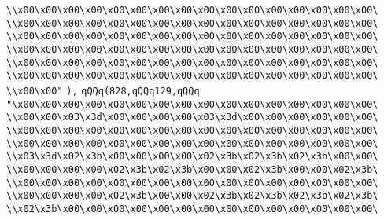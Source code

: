 \verb|\\x00\x00\x00\x00\x00\x00\x00\x00\x00\x00\x00\x00\x00\x00\x00\x00\|\newline
\verb|\\x00\x00\x00\x00\x00\x00\x00\x00\x00\x00\x00\x00\x00\x00\x00\x00\|\newline
\verb|\\x00\x00\x00\x00\x00\x00\x00\x00\x00\x00\x00\x00\x00\x00\x00\x00\|\newline
\verb|\\x00\x00\x00\x00\x00\x00\x00\x00\x00\x00\x00\x00\x00\x00\x00\x00\|\newline
\verb|\\x00\x00\x00\x00\x00\x00\x00\x00\x00\x00\x00\x00\x00\x00\x00\x00\|\newline
\verb|\\x00\x00\x00\x00\x00\x00\x00\x00\x00\x00\x00\x00\x00\x00\x00\x00\|\newline
\verb|\\x00\x00"|\newline
\verb|),|\newline
\verb|qQQq(828,qQQq129,qQQq|\newline
\verb|"\x00\x00\x00\x00\x00\x00\x00\x00\x00\x00\x00\x00\x00\x00\x00\x00\|\newline
\verb|\\x00\x00\x03\x3d\x00\x00\x00\x00\x03\x3d\x00\x00\x00\x00\x00\x00\|\newline
\verb|\\x00\x00\x00\x00\x00\x00\x00\x00\x00\x00\x00\x00\x00\x00\x00\x00\|\newline
\verb|\\x00\x00\x00\x00\x00\x00\x00\x00\x00\x00\x00\x00\x00\x00\x00\x00\|\newline
\verb|\\x03\x3d\x02\x3b\x00\x00\x00\x00\x02\x3b\x02\x3b\x02\x3b\x00\x00\|\newline
\verb|\\x00\x00\x00\x00\x02\x3b\x02\x3b\x00\x00\x02\x3b\x00\x00\x02\x3b\|\newline
\verb|\\x00\x00\x00\x00\x00\x00\x00\x00\x00\x00\x00\x00\x00\x00\x00\x00\|\newline
\verb|\\x00\x00\x00\x00\x02\x3b\x00\x00\x02\x3b\x02\x3b\x02\x3b\x02\x3b\|\newline
\verb|\\x02\x3b\x00\x00\x00\x00\x00\x00\x00\x00\x00\x00\x00\x00\x00\x00\|\newline
